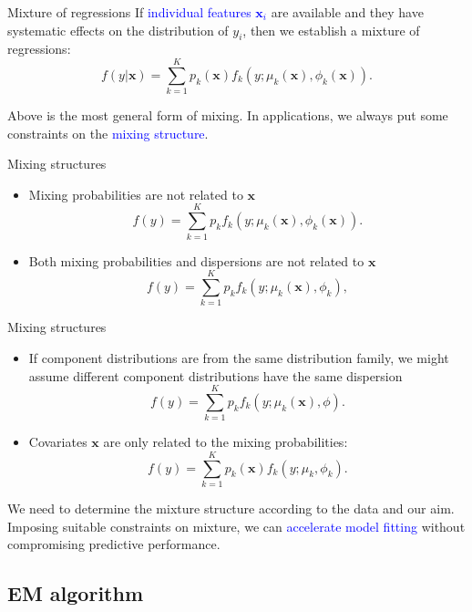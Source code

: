 \documentclass[professionalfont]{beamer}
\def\bx{\boldsymbol{x}}
\newcommand{\blue}[1]{\textcolor{blue}{#1}}
\begin{document}
 \begin{frame}{Mixture of regressions}
 	If \blue{individual features $\bx_i$} are available and they have systematic effects on the distribution of $y_i$, then we establish a mixture of regressions:
 	$$f(y|\bx)=\sum_{k=1}^Kp_k(\bx)f_k(y;\mu_k(\bx),\phi_k(\bx)).$$

 	Above is the most general form of mixing. 	In applications, we always put some constraints on the \blue{mixing structure}.
 \end{frame}

  \begin{frame}{Mixing structures}

 	\begin{itemize}
 		\item Mixing probabilities are not related to $\bx$
 		$$f(y)=\sum_{k=1}^Kp_kf_k(y;\mu_k(\bx),\phi_k(\bx)).$$
 		\item Both mixing probabilities and dispersions are not related to $\bx$
 		 	$$f(y)=\sum_{k=1}^Kp_kf_k(y;\mu_k(\bx),\phi_k),$$
 		 	 	\end{itemize}
 	 	 \end{frame}

  \begin{frame}{Mixing structures}

	\begin{itemize}
 		\item If component distributions are from the same distribution family, we might assume different component distributions have the same dispersion
 		 	$$f(y)=\sum_{k=1}^Kp_kf_k(y;\mu_k(\bx),\phi).$$
 		 \item Covariates $\bx$ are only related to the mixing probabilities:
 		  	$$f(y)=\sum_{k=1}^Kp_k(\bx)f_k(y;\mu_k,\phi_k).$$
 	\end{itemize}

We need to determine the mixture structure according to the data and our aim. Imposing suitable constraints on mixture, we can \blue{accelerate model fitting} without compromising predictive performance.

\end{frame}

\subsection{EM algorithm}
\end{document}
